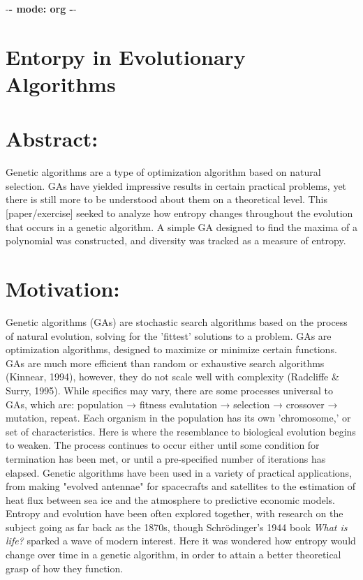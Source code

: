 \documentclass[11pt]{article}
\date{\today}
\title{}
\begin{document}
\tableofcontents

-\textbf{- mode: org -}-

\section{Entorpy in Evolutionary Algorithms}
\label{sec:org26f53e0}
\section{Abstract:}
\label{sec:orga17da23}
Genetic algorithms are a type of optimization algorithm based on natural selection. GAs have yielded
impressive results in certain practical problems, yet there is still more to be understood about them
on a theoretical level. This [paper/exercise] seeked to analyze how entropy changes throughout the
evolution that occurs in a genetic algorithm. A simple GA designed to find the maxima of a polynomial
was constructed, and diversity was tracked as a measure of entropy.

\section{Motivation:}
\label{sec:org16abecd}
Genetic algorithms (GAs) are stochastic search algorithms based on the process of natural evolution, solving for
the 'fittest' solutions to a problem. GAs are optimization algorithms, designed to maximize or minimize certain
functions. GAs are much more efficient than random or exhaustive search algorithms (Kinnear, 1994), however, they
do not scale well with complexity (Radcliffe \& Surry, 1995). While specifics may vary, there are some processes
universal to GAs, which are: population → fitness evalutation → selection → crossover → mutation, repeat. Each 
organism in the population has its own 'chromosome,' or set of characteristics. Here is where the resemblance 
to biological evolution begins to weaken. The process continues to occur either until some condition for termination
has been met, or until a pre-specified number of iterations has elapsed. Genetic algorithms have been used in a
variety of practical applications, from making "evolved antennae" for spacecrafts and satellites to the estimation
of heat flux between sea ice and the atmosphere to predictive economic models. Entropy and evolution have been
often explored together, with research on the subject going as far back as the 1870s, though Schrödinger's 1944
book \emph{What is life?} sparked a wave of modern interest. Here it was wondered how entropy would change over time
in a genetic algorithm, in order to attain a better theoretical grasp of how they function.
\end{document}
